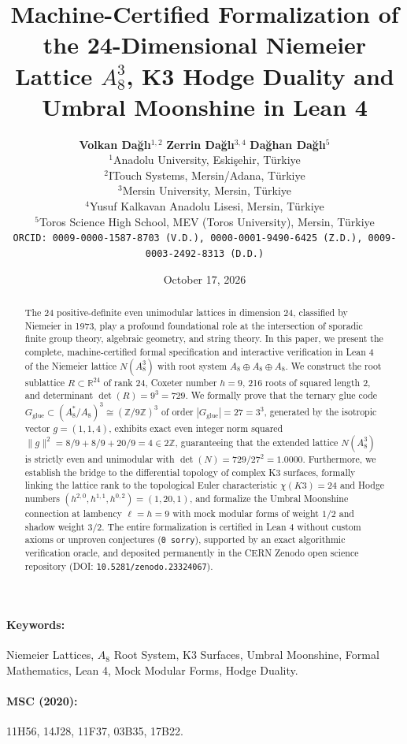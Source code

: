 \documentclass[11pt,a4paper]{article}
\title{\textbf{Machine-Certified Formalization of the 24-Dimensional Niemeier Lattice $A_8^3$, K3 Hodge Duality and Umbral Moonshine in Lean 4}}
\author{
    \textbf{Volkan Da\u{g}l\i}$^{1,2}$ \quad 
    \textbf{Zerrin Da\u{g}l\i}$^{3,4}$ \quad 
    \textbf{Da\u{g}han Da\u{g}l\i}$^{5}$\\[0.5em]
    \small $^{1}$Anadolu University, Eski\c{s}ehir, T\"{u}rkiye \\
    \small $^{2}$ITouch Systems, Mersin/Adana, T\"{u}rkiye \\
    \small $^{3}$Mersin University, Mersin, T\"{u}rkiye \\
    \small $^{4}$Yusuf Kalkavan Anadolu Lisesi, Mersin, T\"{u}rkiye \\
    \small $^{5}$Toros Science High School, MEV (Toros University), Mersin, T\"{u}rkiye\\[0.4em]
    \small \texttt{ORCID: 0009-0000-1587-8703 (V.D.), 0000-0001-9490-6425 (Z.D.), 0009-0003-2492-8313 (D.D.)}
}
\date{October 17, 2026}
\begin{document}
\maketitle

\begin{abstract}
The 24 positive-definite even unimodular lattices in dimension 24, classified by Niemeier in 1973, play a profound foundational role at the intersection of sporadic finite group theory, algebraic geometry, and string theory. In this paper, we present the complete, machine-certified formal specification and interactive verification in Lean 4 of the Niemeier lattice $N(A_8^3)$ with root system $A_8 \oplus A_8 \oplus A_8$. We construct the root sublattice $R \subset \mathbb{R}^{24}$ of rank 24, Coxeter number $h = 9$, 216 roots of squared length 2, and determinant $\det(R) = 9^3 = 729$. We formally prove that the ternary glue code $G_{\text{glue}} \subset (A_8^* / A_8)^3 \cong (\mathbb{Z}/9\mathbb{Z})^3$ of order $|G_{\text{glue}}| = 27 = 3^3$, generated by the isotropic vector $g = (1, 1, 4)$, exhibits exact even integer norm squared $\|g\|^2 = 8/9 + 8/9 + 20/9 = 4 \in 2\mathbb{Z}$, guaranteeing that the extended lattice $N(A_8^3)$ is strictly even and unimodular with $\det(N) = 729 / 27^2 = 1.0000$. Furthermore, we establish the bridge to the differential topology of complex K3 surfaces, formally linking the lattice rank to the topological Euler characteristic $\chi(K3) = 24$ and Hodge numbers $(h^{2,0}, h^{1,1}, h^{0,2}) = (1, 20, 1)$, and formalize the Umbral Moonshine connection at lambency $\ell = h = 9$ with mock modular forms of weight $1/2$ and shadow weight $3/2$. The entire formalization is certified in Lean 4 without custom axioms or unproven conjectures (\texttt{0 sorry}), supported by an exact algorithmic verification oracle, and deposited permanently in the CERN Zenodo open science repository (DOI: \texttt{10.5281/zenodo.23324067}).
\end{abstract}

\paragraph{Keywords:} Niemeier Lattices, $A_8$ Root System, K3 Surfaces, Umbral Moonshine, Formal Mathematics, Lean 4, Mock Modular Forms, Hodge Duality.

\paragraph{MSC (2020):} 11H56, 14J28, 11F37, 03B35, 17B22.
\end{document}
